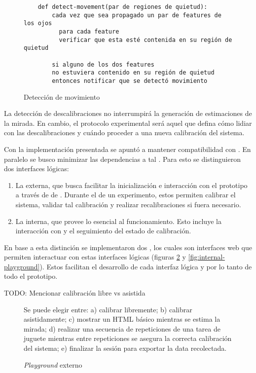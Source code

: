   \begin{figure}
    \begin{verbatim}
    def detect-movement(par de regiones de quietud):
        cada vez que sea propagado un par de features de los ojos
          para cada feature
          verificar que esta esté contenida en su región de quietud

        si alguno de los dos features
        no estuviera contenido en su región de quietud
        entonces notificar que se detectó movimiento
    \end{verbatim}
    \caption{Detección de movimiento}
    \label{fig:movement-detection}
  \end{figure}

  La detección de descalibraciones no interrumpirá la generación de
  estimaciones de la mirada.
  En cambio, el protocolo experimental será aquel que defina cómo lidiar con
  las descalibraciones y cuándo proceder a una nueva calibración del sistema.

  Con la implementación presentada se apuntó a mantener compatibilidad con
  \jspsych.
  En paralelo se busco minimizar las dependencias a tal \framework.
  Para esto se distinguieron dos interfaces lógicas:
  \begin{enumerate}
    \item
      La externa, que busca facilitar la inicialización e interacción con el
      prototipo a través de \timelines de \jspsych.
      Durante el \runtime de un experimento, estos permiten calibrar el
      sistema, validar tal calibración y realizar recalibraciones si fuera
      necesario.
    \item
      La interna, que provee lo esencial al funcionamiento.
      Esto incluye la interacción con \webgazer y el seguimiento del estado de
      calibración.
  \end{enumerate}
  En base a esta distinción se implementaron dos \playgrounds, los cuales son
  interfaces web que permiten interactuar con estas interfaces lógicas (figuras
  \ref{fig:external-playground} y \ref{fig:internal-playground}).
  Estos facilitan el desarrollo de cada interfaz lógica y por lo tanto de todo
  el prototipo.

  TODO: Mencionar calibración libre vs asistida

  \begin{figure}
    \centering
    Se puede elegir entre:
    a) calibrar libremente;
    b) calibrar asistidamente;
    c) mostrar un HTML básico mientras se estima la mirada;
    d) realizar una secuencia de repeticiones de una tarea de juguete mientras
    entre repeticiones se asegura la correcta calibración del sistema;
    e) finalizar la sesión para exportar la data recolectada.
    \caption{\textit{Playground} externo}
    \label{fig:external-playground}
  \end{figure}

